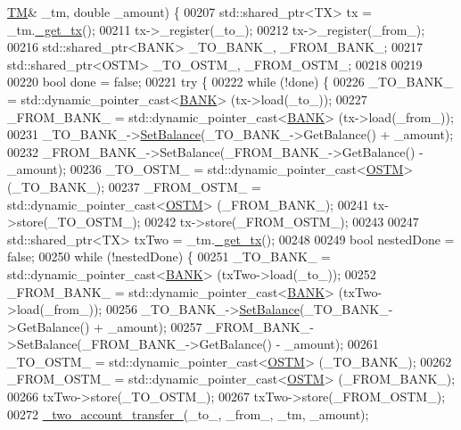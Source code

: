 \begin{DoxyCode}
      \hyperlink{class_t_m}{TM}& \_tm, \textcolor{keywordtype}{double} \_amount) \{
00207     std::shared\_ptr<TX> tx = \_tm.\hyperlink{class_t_m_a41cb0226cc4080c931651b13f74a0075_a41cb0226cc4080c931651b13f74a0075}{\_get\_tx}();
00211     tx->\_register(\_to\_);
00212     tx->\_register(\_from\_);
00216     std::shared\_ptr<BANK> \_TO\_BANK\_, \_FROM\_BANK\_;
00217     std::shared\_ptr<OSTM> \_TO\_OSTM\_, \_FROM\_OSTM\_;
00218 
00219 
00220     \textcolor{keywordtype}{bool} done = \textcolor{keyword}{false};
00221     \textcolor{keywordflow}{try} \{
00222         \textcolor{keywordflow}{while} (!done) \{
00226             \_TO\_BANK\_ = std::dynamic\_pointer\_cast<\hyperlink{class_b_a_n_k}{BANK}> (tx->load(\_to\_));
00227             \_FROM\_BANK\_ = std::dynamic\_pointer\_cast<\hyperlink{class_b_a_n_k}{BANK}> (tx->load(\_from\_));
00231             \_TO\_BANK\_->\hyperlink{class_b_a_n_k_ae3e45b407bf8ec7175662442ea24b7c0_ae3e45b407bf8ec7175662442ea24b7c0}{SetBalance}(\_TO\_BANK\_->GetBalance() + \_amount);
00232             \_FROM\_BANK\_->SetBalance(\_FROM\_BANK\_->GetBalance() - \_amount);
00236             \_TO\_OSTM\_ = std::dynamic\_pointer\_cast<\hyperlink{class_o_s_t_m}{OSTM}> (\_TO\_BANK\_);
00237             \_FROM\_OSTM\_ = std::dynamic\_pointer\_cast<\hyperlink{class_o_s_t_m}{OSTM}> (\_FROM\_BANK\_);
00241             tx->store(\_TO\_OSTM\_);
00242             tx->store(\_FROM\_OSTM\_);
00243 
00247             std::shared\_ptr<TX> txTwo = \_tm.\hyperlink{class_t_m_a41cb0226cc4080c931651b13f74a0075_a41cb0226cc4080c931651b13f74a0075}{\_get\_tx}();
00248 
00249             \textcolor{keywordtype}{bool} nestedDone = \textcolor{keyword}{false};
00250             \textcolor{keywordflow}{while} (!nestedDone) \{
00251                 \_TO\_BANK\_ = std::dynamic\_pointer\_cast<\hyperlink{class_b_a_n_k}{BANK}> (txTwo->load(\_to\_));
00252                 \_FROM\_BANK\_ = std::dynamic\_pointer\_cast<\hyperlink{class_b_a_n_k}{BANK}> (txTwo->load(\_from\_));
00256                 \_TO\_BANK\_->\hyperlink{class_b_a_n_k_ae3e45b407bf8ec7175662442ea24b7c0_ae3e45b407bf8ec7175662442ea24b7c0}{SetBalance}(\_TO\_BANK\_->GetBalance() + \_amount);
00257                 \_FROM\_BANK\_->SetBalance(\_FROM\_BANK\_->GetBalance() - \_amount);
00261                 \_TO\_OSTM\_ = std::dynamic\_pointer\_cast<\hyperlink{class_o_s_t_m}{OSTM}> (\_TO\_BANK\_);
00262                 \_FROM\_OSTM\_ = std::dynamic\_pointer\_cast<\hyperlink{class_o_s_t_m}{OSTM}> (\_FROM\_BANK\_);
00266                 txTwo->store(\_TO\_OSTM\_);
00267                 txTwo->store(\_FROM\_OSTM\_);
00272                 \hyperlink{main_8cpp_a83aef8c5b69afef4e38d14c17fe782b3_a83aef8c5b69afef4e38d14c17fe782b3}{\_two\_account\_transfer\_}(\_to\_, \_from\_, \_tm, \_amount);

\end{DoxyCode}
